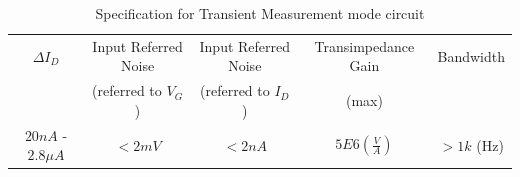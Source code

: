 \begin{table}[!htbp]
    {\fontfamily{}\fontsize{10}{14}\selectfont
    \centering
    \begin{tabular}{c|c|c|c|c}
        $\Delta I_D$&Input Referred Noise&Input Referred Noise&Transimpedance Gain &Bandwidth\\
                   & (referred to $V_G$)& (referred to $I_D$)  & (max) & \\
        \hline
        $20n A$ - $2.8\mu A$&$< 2m V$& $< 2n A$&$5E6(\frac{V}{A})$&$> 1k$ (Hz)\\
    \end{tabular}
    \caption{Specification for Transient Measurement mode circuit}
    \label{tb:ACSpec}
    }
\end{table}





 

